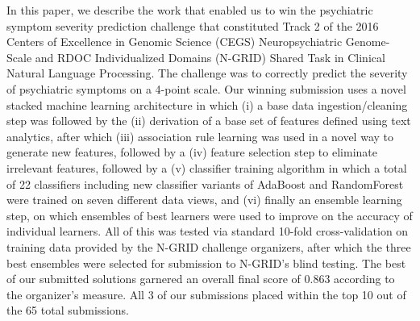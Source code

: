 In this paper, we describe the work that enabled us to win the psychiatric symptom severity prediction challenge that constituted 
Track 2 of the 2016 Centers of Excellence in Genomic Science (CEGS) Neuropsychiatric Genome-Scale and RDOC Individualized Domains (N-GRID) Shared Task in Clinical Natural Language Processing.  
The challenge was to correctly predict the severity of psychiatric symptoms on a 4-point scale. Our winning submission uses a novel stacked machine learning architecture in which (i) a base data ingestion/cleaning step was followed by the (ii) derivation of a base set of features defined using text analytics, after which 
(iii) association rule learning was used in a novel way to generate new features, followed by a (iv) feature selection step to eliminate irrelevant features, followed by a (v) classifier training algorithm in which a total of 22 classifiers including new classifier variants of AdaBoost and RandomForest were trained on seven different data views, and (vi) finally an ensemble learning step, on which
ensembles of best learners were used to improve on the accuracy of individual learners. All of this was tested via standard 10-fold cross-validation on training data provided by the N-GRID challenge organizers, after which the three best ensembles were selected for submission to N-GRID's blind testing. The best of our submitted solutions garnered an overall final score of 0.863 according to the organizer's measure. 
All 3 of our submissions placed within the top 10 out of the 65 total submissions.